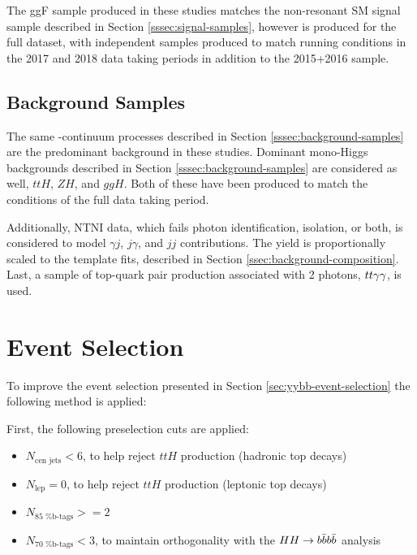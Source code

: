 The ggF \hh sample produced in these studies matches the non-resonant \gls{SM} signal sample described in Section \ref{sssec:signal-samples}, however is produced for the full \RunTwo dataset, with independent samples produced to match running conditions in the 2017 and 2018 data taking periods in addition to the 2015+2016 sample.

\subsection{Background Samples} \label{ssec:vbf-bkg-samples}

The same \yy-continuum processes described in Section \ref{sssec:background-samples} are the predominant background in these studies. Dominant mono-Higgs backgrounds described in Section \ref{sssec:background-samples} are considered as well, $ttH$, $ZH$, and $ggH$. Both of these have been produced to match the conditions of the full \RunTwo data taking period.

Additionally, \gls{NTNI} data, which fails photon identification, isolation, or both, is considered to model $\gamma j$, $j \gamma$, and $jj$ contributions. The yield is proportionally scaled to the template fits, described in Section \ref{ssec:background-composition}. Last, a sample of top-quark pair production associated with 2 photons, $tt \gamma\gamma$, is used. 


\section{Event Selection} \label{ssec:vbf-event-selection}

To improve the event selection presented in Section \ref{sec:yybb-event-selection} the following method is applied:

First, the following preselection cuts are applied:

\begin{itemize}
	\item $N_{\text{cen jets}} < 6$, to help reject $ttH$ production (hadronic top decays)
	\item $N_{\text{lep}} = 0$, to help reject $ttH$ production (leptonic top decays)
	\item $N_{\text{85 \% b-tags}} >= 2$ 
	\item $N_{\text{70 \% b-tags}} < 3$, to maintain orthogonality with the $HH \rightarrow b\bar{b}b\bar{b}$ analysis
\end{itemize}

